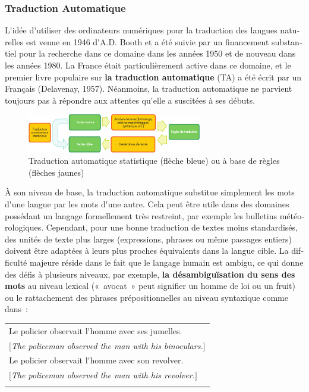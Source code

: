 \begin{french}
\begin{multicols}{2}
\subsubsection{Traduction Automatique}
L{\mbox '}idée d{\mbox '}utiliser des ordinateurs numériques pour la traduction des
langues naturelles est venue en 1946 d{\mbox '}A.D. Booth et a été suivie par
un financement substantiel pour la recherche dans ce domaine dans les
années 1950 et de nouveau dans les années 1980. La France était
particulièrement active dans ce domaine, et le premier livre populaire
sur {\bf la traduction automatique} (TA) a été écrit par un Français
(Delavenay, 1957). Néanmoins, la traduction automatique ne
parvient toujours pas à répondre aux attentes qu{\mbox '}elle a suscitées à
ses débuts.

\begin{figure}[!ht]
\begin{center}
 \includegraphics[width=3.0in]{../_media/french/machine_translation}
\caption{Traduction automatique statistique (flèche bleue) ou à base de règles (flèches jaunes)}
\label{fig:mtarchi}
\end{center}
\end{figure}

À son niveau de base, la traduction automatique substitue simplement les mots d{\mbox '}une langue
par les mots d{\mbox '}une autre. Cela peut être utile dans des domaines
possédant un langage formellement très restreint, par exemple les
bulletins météorologiques. Cependant, pour une bonne traduction de
textes moins standardisés, des unités de texte plus larges
(expressions, phrases ou même passages entiers) doivent être adaptées à
leurs plus proches équivalents dans la langue cible. La difficulté
majeure réside dans le fait que le langage humain est ambigu, ce qui
donne des défis à plusieurs niveaux, par exemple, {\bf la
  désambiguïsation du sens des mots} au niveau lexical («~avocat~»
peut signifier un homme de loi ou un fruit) ou le rattachement des phrases prépositionnelles au niveau syntaxique comme dans~:

\begin{tabular}{l}
\\
Le policier observait l{\mbox '}homme avec ses jumelles.\\
$[${\it The policeman observed the man with his binoculars.}$]$\\
Le policier observait l{\mbox '}homme avec son revolver.\\
$[${\it The policeman observed the man with his revolver.}$]$\\
\\
\end{tabular}


\end{multicols}
\end{french}
